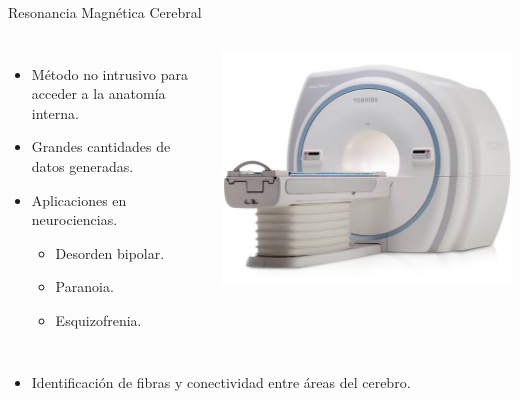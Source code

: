 \begin{frame}[t]{Resonancia Magnética Cerebral}
\begin{columns}
\begin{itemize}
  \item Método no intrusivo para acceder a la anatomía interna.
  \item Grandes cantidades de datos generadas.
  \item Aplicaciones en neurociencias.
    \begin{itemize}
      \item Desorden bipolar.
      \item Paranoia.
      \item Esquizofrenia.
    \end{itemize}
\end{itemize}

\includegraphics[width=\textwidth]{img/mri-scanner.jpg}
\end{columns}

\vspace{2em}
\begin{itemize}
  \item Identificación de fibras y conectividad entre áreas del cerebro.
\end{itemize}

\end{frame}


